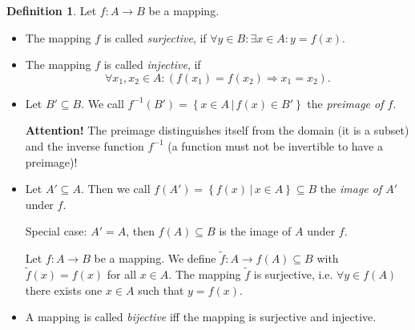 \documentclass[a4paper,landscape,twocolumn]{article}
\theoremstyle{definition}
\newtheorem{defi}{Definition}
\newcommand\setdef[2]{\left\{#1\,|\,#2\right\}}
\begin{document}
\begin{defi}
  Let $f: A \rightarrow B$ be a mapping.
  \begin{itemize}
    \item
      The mapping $f$ is called \emph{surjective},
      if $\forall y \in B: \exists x \in A: y = f(x)$.
    \item
      The mapping $f$ is called \emph{injective}, if
      \[ \forall x_1, x_2 \in A: (f(x_1) = f(x_2) \Rightarrow x_1 = x_2). \]
    \item
      Let $B' \subseteq B$. We call $f^{-1}(B') = \setdef{x \in A}{f(x) \in B'}$ the \emph{preimage of $f$}.

      \textbf{Attention!} The preimage distinguishes itself from the domain (it is a subset)
      and the inverse function $f^{-1}$ (a function must not be invertible to have a preimage)!
    \item
      Let $A' \subseteq A$. Then we call $f(A') = \setdef{f(x)}{x \in A} \subseteq B$ the \emph{image of $A'$} under $f$.

      Special case: $A' = A$, then $f(A) \subseteq B$ is the image of $A$ under $f$.

      Let $f: A \rightarrow B$ be a mapping. We define $\tilde f: A \rightarrow f(A) \subseteq B$ with
      $\tilde f(x) = f(x)$ for all $x \in A$. The mapping $\tilde f$ is surjective, i.e. $\forall y \in f(A)$ there exists one $x \in A$ such that $y = f(x)$.
    \item
      A mapping is called \emph{bijective}
      iff the mapping is surjective and injective.
  \end{itemize}
\end{defi}
\end{document}
